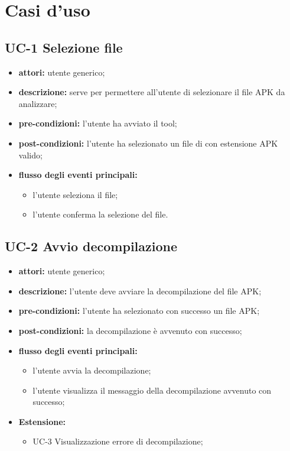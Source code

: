 \section{Casi d'uso}\label{sec:casi-d'uso}
\subsection*{UC-1 Selezione file}\label{subsec:uc-1-selezione-file}
\begin{itemize}
    \item \textbf{attori:} utente generico;
    \item \textbf{descrizione:} serve per permettere all'utente di selezionare il file APK da analizzare;
    \item \textbf{pre-condizioni:} l'utente ha avviato il tool;
    \item \textbf{post-condizioni:} l'utente ha selezionato un file di con estensione \gls{APK} valido;
    \item \textbf{flusso degli eventi principali:}
    \begin{itemize}
        \item l'utente seleziona il file;
        \item l'utente conferma la selezione del file.
    \end{itemize}
\end{itemize}
\subsection*{UC-2 Avvio decompilazione}\label{subsec:uc-2-avvio-decompilazione}
\begin{itemize}
    \item \textbf{attori:} utente generico;
    \item \textbf{descrizione:} l'utente deve avviare la decompilazione del file APK;
    \item \textbf{pre-condizioni:} l'utente ha selezionato con successo un file APK;
    \item \textbf{post-condizioni:} la decompilazione è avvenuto con successo;
    \item \textbf{flusso degli eventi principali:}
    \begin{itemize}
        \item l'utente avvia la decompilazione;
        \item l'utente visualizza il messaggio della decompilazione avvenuto con successo;
    \end{itemize}
    \item \textbf{Estensione:}
    \begin{itemize}
        \item UC-3 Visualizzazione errore di decompilazione;
    \end{itemize}
\end{itemize}

